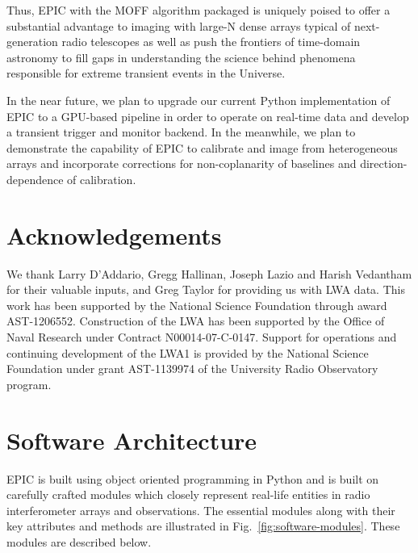 \documentclass[a4paper,fleqn,usenatbib]{mnras}
\begin{document}
Thus, EPIC with the MOFF algorithm packaged is uniquely poised to offer a
substantial advantage to imaging with large-N dense arrays typical of 
next-generation radio telescopes as well as push the frontiers of 
time-domain astronomy to fill gaps in understanding the science behind 
phenomena responsible for extreme transient events in the Universe.

In the near future, we plan to upgrade our current Python implementation 
of EPIC to a GPU-based pipeline in order to operate on real-time data and 
develop a transient trigger and monitor backend. In the meanwhile, we plan 
to demonstrate the capability of EPIC to calibrate and image from heterogeneous 
arrays and incorporate corrections for non-coplanarity of baselines and 
direction-dependence of calibration. 

\section*{Acknowledgements}

We thank Larry D'Addario, Gregg Hallinan, Joseph Lazio and Harish Vedantham for 
their valuable inputs, and Greg Taylor for providing us with LWA data. This work 
has been supported by the National Science Foundation through award AST-1206552. 
Construction of the LWA has been supported by the Office of Naval Research under 
Contract N00014-07-C-0147. Support for operations and continuing development of 
the LWA1 is provided by the National Science Foundation under grant AST-1139974 
of the University Radio Observatory program.



 
%  
% 


\appendix

\section{Software Architecture}\label{sec:software-modules}

EPIC is built using object oriented programming in Python and is built on
carefully crafted modules which closely represent real-life entities in radio 
interferometer arrays and observations. The essential modules along with their
key attributes and methods are illustrated in Fig.~\ref{fig:software-modules}.
These modules are described below.
\end{document}
